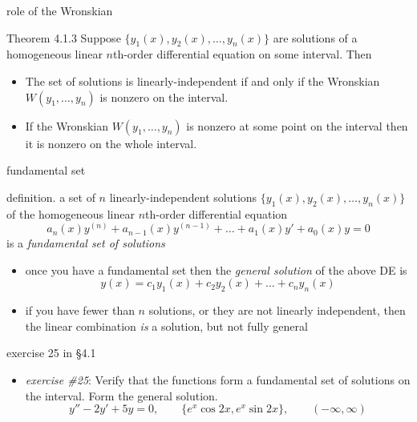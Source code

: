 \documentclass{beamer}
\begin{document}
\begin{frame}{role of the Wronskian}

\begin{block}{Theorem 4.1.3}
Suppose $\{y_1(x),y_2(x),\dots,y_n(x)\}$ are solutions of a homogeneous linear $n$th-order differential equation on some interval.  Then
\begin{itemize}
\item The set of solutions is linearly-independent if and only if the Wronskian $W(y_1,\dots,y_n)$ is nonzero on the interval.
\item If the Wronskian $W(y_1,\dots,y_n)$ is nonzero at some point on the interval then it is nonzero on the whole interval.
\end{itemize}
\end{block}
\end{frame}


\begin{frame}{fundamental set}

\begin{block}{definition.}  a set of $n$ linearly-independent solutions $\{y_1(x),y_2(x),\dots,y_n(x)\}$ of the homogeneous linear $n$th-order differential equation
\begin{equation*}
    a_n(x) y^{(n)} + a_{n-1}(x) y^{(n-1)} + \dots + a_1(x) y' + a_0(x) y = 0
\end{equation*}
is a \emph{fundamental set of solutions}
\end{block}

\begin{itemize}
\item once you have a fundamental set then the \emph{general solution} of the above DE is
    $$y(x) = c_1 y_1(x) + c_2 y_2(x) + \dots + c_n y_n(x)$$
\item if you have fewer than $n$ solutions, or they are not linearly independent, then the linear combination \emph{is} a solution, but not fully general
\end{itemize}
\end{frame}


\begin{frame}{exercise 25 in \S 4.1}

\begin{itemize}
\item \emph{exercise \#25}:  Verify that the functions form a fundamental set  of solutions on the interval.  Form the general solution.
    $$y''-2y'+5y=0, \qquad \{e^x\cos 2x,e^x\sin 2x\}, \qquad (-\infty,\infty)$$
\end{itemize}

\vspace{50mm}
\end{frame}
\end{document}
